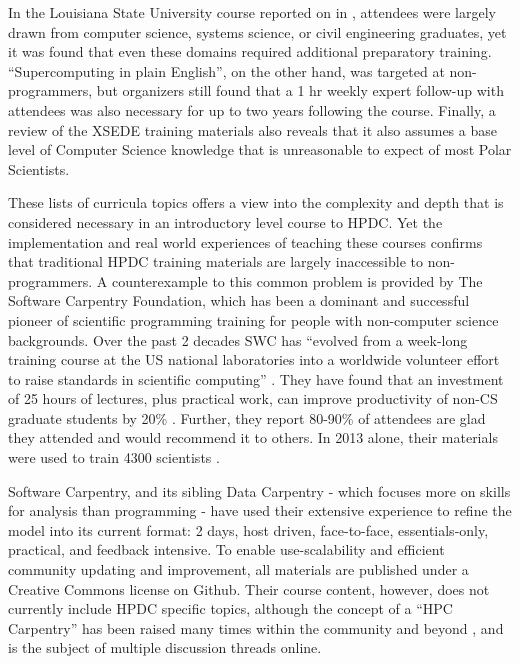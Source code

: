 \documentclass[conference]{IEEEtran}
\begin{document}
In the Louisiana State University course reported on in \cite{Allen2011-qx}, attendees were largely drawn from computer science, systems science, or civil engineering graduates, yet it was found that even these domains required additional preparatory training. ``Supercomputing in plain English'', on the other hand, was targeted at non-programmers, but organizers still found that a 1 hr weekly expert follow-up with attendees was also necessary for up to two years following the course.  Finally, a review of the XSEDE training materials also reveals that it also assumes a base level of Computer Science knowledge that is unreasonable to expect of most Polar Scientists.

These lists of curricula topics offers a view into the complexity and depth that is considered necessary in an introductory level course to HPDC. Yet the implementation and real world experiences of teaching these courses confirms that traditional HPDC training materials are largely inaccessible to non-programmers. A counterexample to this common problem is provided by The Software Carpentry Foundation, which has been a dominant and successful pioneer of scientific programming training for people with non-computer science backgrounds. Over the past 2 decades SWC has ``evolved from a week-long training course at the US national laboratories into a worldwide volunteer effort to raise standards in scientific computing'' \cite{Wilson2014-pc}. They have found that an investment of 25 hours of lectures, plus practical work, can improve productivity of non-CS graduate students by 20\% \cite{Wilson_undated-yk}. Further, they report 80-90\% of attendees are glad they attended and would recommend it to others. In 2013 alone, their materials were used to train 4300 scientists \cite{Wilson2014-pc}.

Software Carpentry, and its sibling Data Carpentry\cite{Mimno2016-cw} - which focuses more on skills for analysis than programming - have used their extensive experience to refine the model into its current format: 2 days, host driven, face-to-face, essentials-only, practical, and feedback intensive. To enable use-scalability and efficient community updating and improvement, all materials are published under a Creative Commons license on Github.  Their course content, however, does not currently include HPDC specific topics, although the concept of a “HPC Carpentry” has been raised many times within the community \cite{Data Carpentry_undated-zl} and beyond \cite{noauthor_undated-zw}, and is the subject of multiple discussion threads online. 
\end{document}
